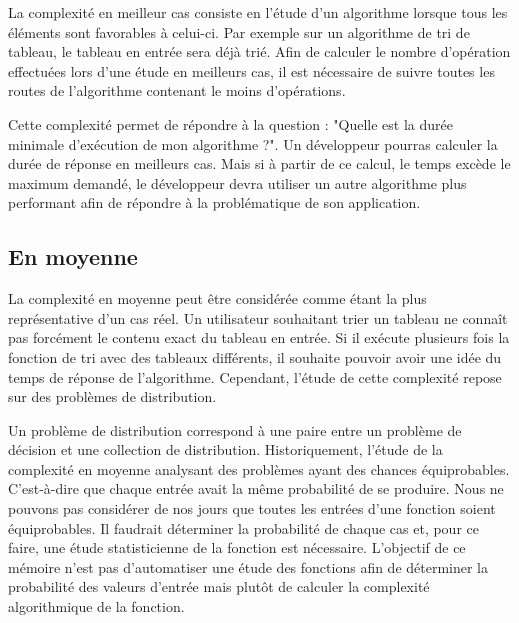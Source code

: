 \documentclass[12pt, twoside, openright]{report}
\begin{document}
La complexité en meilleur cas consiste en l'étude d'un algorithme lorsque tous les éléments sont favorables à celui-ci. Par exemple sur un algorithme de tri de tableau, le tableau en entrée sera déjà trié. Afin de calculer le nombre d'opération effectuées lors d'une étude en meilleurs cas, il est nécessaire de suivre toutes les routes de l'algorithme contenant le moins d'opérations. 

Cette complexité permet de répondre à la question : "Quelle est la durée minimale d'exécution de mon algorithme ?". Un développeur pourras calculer la durée de réponse en meilleurs cas. Mais si à partir de ce calcul, le temps excède le maximum demandé, le développeur devra utiliser un autre algorithme plus performant afin de répondre à la problématique de son application. 

\subsection{En moyenne}


La complexité en moyenne peut être considérée comme étant la plus représentative d'un cas réel. Un utilisateur souhaitant trier un tableau ne connaît pas forcément le contenu exact du tableau en entrée. Si il exécute plusieurs fois la fonction de tri avec des tableaux différents, il souhaite pouvoir avoir une idée du temps de réponse de l'algorithme. Cependant, l'étude de cette complexité repose sur des problèmes de distribution.

Un problème de distribution correspond à une paire entre un problème de décision et une collection de distribution. Historiquement, l'étude de la complexité en moyenne analysant des problèmes ayant des chances équiprobables.\cite{avgComplexity02} C'est-à-dire que chaque entrée avait la même probabilité de se produire. Nous ne pouvons pas considérer de nos jours que toutes les entrées d'une fonction soient équiprobables. Il faudrait déterminer la probabilité de chaque cas et, pour ce faire, une étude statisticienne de la fonction est nécessaire. L'objectif de ce mémoire n'est pas d'automatiser une étude des fonctions afin de déterminer la probabilité des valeurs d'entrée mais plutôt de calculer la complexité algorithmique de la fonction.
\end{document}
